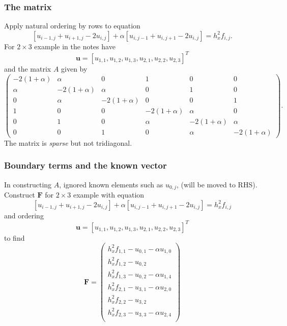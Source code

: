 \documentclass{beamer}
\newcommand{\bfm}[1]{{\boldsymbol{#1}}}
\begin{document}
\begin{frame}
  \frametitle{The matrix}

  Apply natural ordering by rows to equation
  \begin{equation*}
    \left[ u_{i-1, j} + u_{i+1,j} - 2 u_{i,j} \right] + \alpha \left[
      u_{i, j-1} + u_{i,j+1} - 2 u_{i,j} \right] = h_x^2 f_{i,j}.
  \end{equation*} \pause
  For $2 \times 3$ example in the notes have
  \begin{equation*}
    \bfm{u} = [u_{1,1} , u_{1,2} , u_{1,3} , u_{2,1} , u_{2,2} , u_{2,3}]^T
  \end{equation*}
  and the matrix $A$ given by
  {\small
    \begin{equation*}
      \begin{pmatrix}
        -2 ( 1 + \alpha ) & \alpha & 0 & 1 & 0 & 0 \\
        \alpha & -2 ( 1 + \alpha ) & \alpha & 0 & 1 & 0 \\
        0 & \alpha & -2 ( 1 + \alpha ) & 0 & 0 & 1 \\
        1 & 0 & 0 & -2 ( 1 + \alpha ) & \alpha & 0 \\
        0 & 1 & 0 & \alpha & -2 ( 1 + \alpha ) & \alpha \\
        0 & 0 & 1 & 0 & \alpha & -2 ( 1 + \alpha )
      \end{pmatrix}.
    \end{equation*}
  }
  The matrix is \emph{sparse} but not tridiagonal.

\end{frame}

\begin{frame}
  \frametitle{Boundary terms and the known vector}

  In constructing $A$, ignored known elements such as $u_{0,j}$, (will
  be moved to RHS). \pause  Construct $\bfm{F}$ for $2 \times 3$
  example with equation
  \begin{equation*}
    \left[ u_{i-1, j} + u_{i+1,j} - 2 u_{i,j} \right] + \alpha \left[
      u_{i, j-1} + u_{i,j+1} - 2 u_{i,j} \right] = h_x^2 f_{i,j}
  \end{equation*}
  and ordering
  \begin{equation*}
    \bfm{u} = [u_{1,1} , u_{1,2} , u_{1,3} , u_{2,1} , u_{2,2} , u_{2,3}]^T
  \end{equation*}
  to find
  \begin{equation*}
    \bfm{F} =
    \begin{pmatrix}
      h_x^2 f_{1,1} - u_{0,1} - \alpha u_{1,0} \\
      h_x^2 f_{1,2} - u_{0,2} \\
      h_x^2 f_{1,3} - u_{0,2} - \alpha u_{1,4} \\
      h_x^2 f_{2,1} - u_{3,1} - \alpha u_{2,0} \\
      h_x^2 f_{2,2} - u_{3,2} \\
      h_x^2 f_{2,3} - u_{3,3} - \alpha u_{2,4} \\
    \end{pmatrix}
  \end{equation*}

\end{frame}
\end{document}
